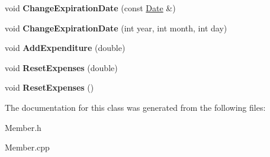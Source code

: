 \begin{DoxyCompactItemize}
\item 
void {\bfseries Change\+Expiration\+Date} (const \hyperlink{class_date}{Date} \&)\hypertarget{class_member_a13fe2db5fd5eee4754c4d55ee0dd7ef5}{}\label{class_member_a13fe2db5fd5eee4754c4d55ee0dd7ef5}

\item 
void {\bfseries Change\+Expiration\+Date} (int year, int month, int day)\hypertarget{class_member_a520c6c140590c66aa2d9b60aada1b684}{}\label{class_member_a520c6c140590c66aa2d9b60aada1b684}

\item 
void {\bfseries Add\+Expenditure} (double)\hypertarget{class_member_a29b9d1e66e6602816ca445ffc788f55d}{}\label{class_member_a29b9d1e66e6602816ca445ffc788f55d}

\item 
void {\bfseries Reset\+Expenses} (double)\hypertarget{class_member_a884e687a9a9f94f39a4235d4c891b614}{}\label{class_member_a884e687a9a9f94f39a4235d4c891b614}

\item 
void {\bfseries Reset\+Expenses} ()\hypertarget{class_member_ab0cd034797c6a590b8c01c821aaec200}{}\label{class_member_ab0cd034797c6a590b8c01c821aaec200}

\end{DoxyCompactItemize}


The documentation for this class was generated from the following files\+:\begin{DoxyCompactItemize}
\item 
Member.\+h\item 
Member.\+cpp\end{DoxyCompactItemize}

